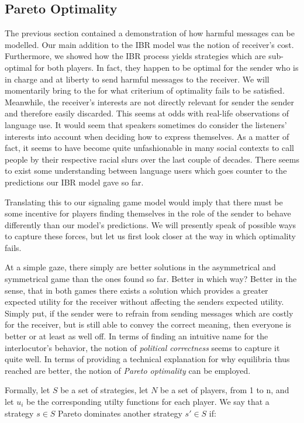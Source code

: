 \documentclass{article}
\begin{document}
\subsection{Pareto Optimality}
The previous section contained a demonstration of how harmful messages can be modelled. Our main addition to the IBR model was the notion of receiver's cost. Furthermore, we showed how the IBR process yields strategies which are sub-optimal for both players. In fact, they happen to be optimal for the sender who is in charge and at liberty to send harmful messages to the receiver. We will momentarily bring to the for what criterium of optimality fails to be satisfied. Meanwhile, the receiver's interests are not directly relevant for sender the sender and therefore easily discarded. This seems at odds with real-life observations of language use. It would seem that speakers sometimes do consider the listeners' interests into account when deciding how to express themselves. As a matter of fact, it seems to have become quite unfashionable in many social contexts to call people by their respective racial slurs over the last couple of decades. There seems to exist some understanding between language users which goes counter to the predictions our IBR model gave so far.

Translating this to our signaling game model would imply that there must be some incentive for players finding themselves in the role of the sender to behave differently than our model's predictions. We will presently speak of possible ways to capture these forces, but let us first look closer at the way in which optimality fails.

At a simple gaze, there simply are better solutions in the asymmetrical and symmetrical game than the ones found so far. Better in which way? Better in the sense, that in both games there exists a solution which provides a greater expected utility for the receiver without affecting the senders expected utility. Simply put, if the sender were to refrain from sending messages which are costly for the receiver, but is still able to convey the correct meaning, then everyone is better or at least as well off. In terms of finding an intuitive name for the interlocutor's behavior, the notion of \textit{political correctness} seems to capture it quite well. In terms of providing a technical explanation for why equilibria thus reached are better, the notion of \textit{Pareto optimality} can be employed. 

Formally, let $S$ be a set of strategies, let $N$ be a set of players, from 1 to n, and let $u_i$ be the corresponding utilty functions for each player. We say that a strategy $s \in S$ Pareto dominates another strategy $s' \in S$ if:
\end{document}
